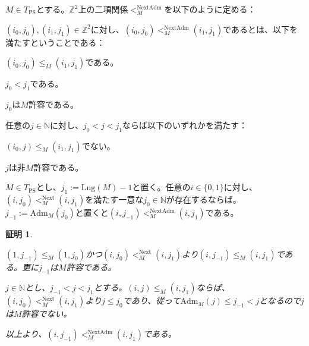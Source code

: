 \documentclass[dvipdfmx,uplatex]{jsarticle}
\theoremstyle{customnonumberbreakfortheorem}
\theoremstyle{customnonumberbreakforproof}
\newtheorem{hideableproof}{証明}
\begin{document}
\(M \in T_{\textrm{PS}}\)とする。\(\mathbb{Z}^2\)上の二項関係\(<_M^{\textrm{NextAdm}}\)を以下のように定める：
\begin{nenumerate}
	\item \((i_0,j_0), (i_1,j_1) \in \mathbb{Z}^2\)に対し、\((i_0,j_0)  <_M^{\textrm{NextAdm}} (i_1,j_1)\)であるとは、以下を満たすということである：
	\begin{nenumerate}
		\item \((i_0,j_0) \leq_M (i_1,j_1)\)である。
		\item \(j_0 < j_1\)である。
		\item \(j_0\)は\(M\)許容である。
		\item 任意の\(j \in \mathbb{N}\)に対し、\(j_0 < j < j_1\)ならば以下のいずれかを満たす：
		\begin{nenumerate}
			\item \((i_0,j) \leq_M (i_1,j_1)\)でない。
			\item \(j\)は非\(M\)許容である。
		\end{nenumerate}
	\end{nenumerate}
\end{nenumerate}

\begin{proposition}\label{AdmとNextAdmの関係}
	\(M \in T_{\textrm{PS}}\)とし、\(j_1 := \textrm{Lng}(M) - 1\)と置く。任意の\(i \in \{0,1\}\)に対し、\((i,j_0) <_M^{\textrm{Next}} (i,j_1)\)を満たす一意な\(j_0 \in \mathbb{N}\)が存在するならば。\(j_{-1} := \textrm{Adm}_M(j_0)\)と置くと\((i,j_{-1}) <_M^{\textrm{NextAdm}} (i,j_1)\)である。
\end{proposition}

\begin{hideableproof}
	\begin{indented}
		\item \((1,j_{-1}) \leq_M (1,j_0)\)かつ\((i,j_0) <_M^{\textrm{Next}} (i,j_1)\)より\((i,j_{-1}) \leq_M (i,j_1)\)である。更に\(j_{-1}\)は\(M\)許容である。
		\item \(j \in \mathbb{N}\)とし、\(j_{-1} < j < j_1\)とする。\((i,j) \leq_M (i,j_1)\)ならば、\((i,j_0) <_M^{\textrm{Next}} (i,j_1)\)より\(j \leq j_0\)であり、従って\(\textrm{Adm}_M(j) \leq j_{-1} < j\)となるので\(j\)は\(M\)許容でない。
		\item 以上より、\((i,j_{-1}) <_M^{\textrm{NextAdm}} (i,j_1)\)である。
	\end{indented}
\end{hideableproof}
\end{document}

